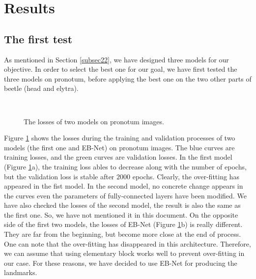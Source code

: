 \documentclass[review]{elsarticle}
\begin{document}
\section{Results}
\label{sec3}
\subsection{The first test}
\label{subsec31}
As mentioned in Section \ref{subsec22}, we have designed three models for our objective. In order to select the best one for our goal, we have first tested the three models on pronotum, before applying the best one on the two other parts of beetle (head and elytra).

\begin{figure}[h!]
    \centering
    ~~
    \caption{The losses of two models on pronotum images.}
    \label{figdlosses}
\end{figure}

Figure \ref{figdlosses} shows the losses during the training and validation processes of two models (the first one and EB-Net) on pronotum images. The blue curves are training losses, and the green curves are validation losses. In the first model (Figure \ref{figdlosses}a), the training loss ables to decrease along with the number of epochs, but the validation loss is stable after $2000$ epochs. Clearly, the over-fitting has appeared in the fist model. In the second model, no concrete change appears in the curves even the parameters of fully-connected layers have been modified. We have also checked the losses of the second model, the result is also the same as the first one. So, we have not mentioned it in this document. On the opposite side of the first two models, the losses of EB-Net (Figure \ref{figdlosses}b) is really different. They are far from the beginning, but become more close at the end of process. One can note that the over-fitting has disappeared in this architecture. Therefore, we can assume that using elementary block works well to prevent over-fitting in our case. For these reasons, we have decided to use EB-Net for producing the landmarks.
\end{document}
